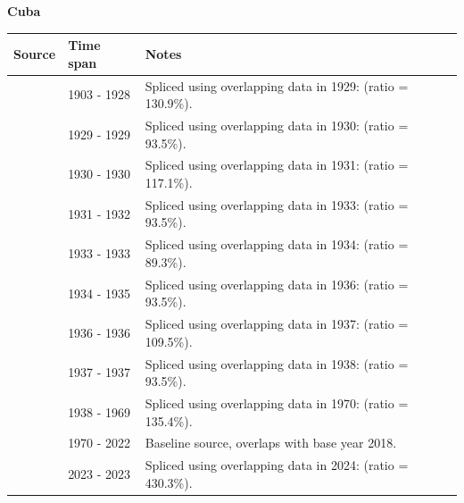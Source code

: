 \documentclass[12pt,a4paper,landscape]{article}
\begin{document}
\begin{adjustbox}{max totalsize={\paperwidth}{\paperheight},center}
\begin{minipage}[t][\textheight][t]{\textwidth}
\vspace*{0.5cm}
{}
\begin{center}
{\Large\bfseries Cuba}
\end{center}
\vspace{0.5cm}
\begin{table}[H]
\centering
\small
\begin{tabular}{|l|l|l|}
\hline
\textbf{Source} & \textbf{Time span} & \textbf{Notes} \\
\hline
\rowcolor{white}\cite{Mitchell}& 1903 - 1928 &Spliced using overlapping data in 1929: (ratio = 130.9\%).\\
\rowcolor{lightgray}\cite{MOXLAD}& 1929 - 1929 &Spliced using overlapping data in 1930: (ratio = 93.5\%).\\
\rowcolor{white}\cite{Mitchell}& 1930 - 1930 &Spliced using overlapping data in 1931: (ratio = 117.1\%).\\
\rowcolor{lightgray}\cite{MOXLAD}& 1931 - 1932 &Spliced using overlapping data in 1933: (ratio = 93.5\%).\\
\rowcolor{white}\cite{Mitchell}& 1933 - 1933 &Spliced using overlapping data in 1934: (ratio = 89.3\%).\\
\rowcolor{lightgray}\cite{MOXLAD}& 1934 - 1935 &Spliced using overlapping data in 1936: (ratio = 93.5\%).\\
\rowcolor{white}\cite{Mitchell}& 1936 - 1936 &Spliced using overlapping data in 1937: (ratio = 109.5\%).\\
\rowcolor{lightgray}\cite{MOXLAD}& 1937 - 1937 &Spliced using overlapping data in 1938: (ratio = 93.5\%).\\
\rowcolor{white}\cite{Mitchell}& 1938 - 1969 &Spliced using overlapping data in 1970: (ratio = 135.4\%).\\
\rowcolor{lightgray}\cite{WDI}& 1970 - 2022 &Baseline source, overlaps with base year 2018.\\
\rowcolor{white}\cite{FAO}& 2023 - 2023 &Spliced using overlapping data in 2024: (ratio = 430.3\%).\\
\hline
\end{tabular}
\end{table}
\begin{figure}[H]
\centering

\end{figure}
\end{minipage}
\end{adjustbox}
\end{document}
